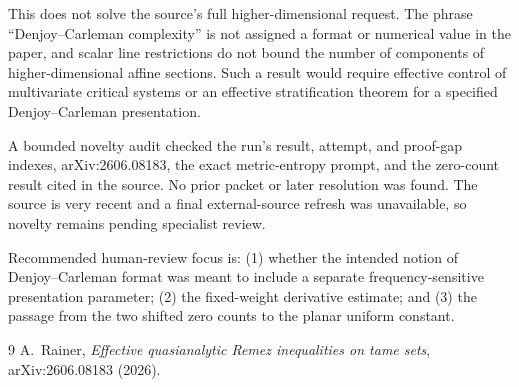 \documentclass[11pt]{article}
\begin{document}
This does not solve the source's full higher-dimensional request.  The phrase
``Denjoy--Carleman complexity'' is not assigned a format or numerical value in
the paper, and scalar line restrictions do not bound the number of components
of higher-dimensional affine sections.  Such a result would require effective
control of multivariate critical systems or an effective stratification
theorem for a specified Denjoy--Carleman presentation.

A bounded novelty audit checked the run's result, attempt, and proof-gap
indexes, arXiv:2606.08183, the exact metric-entropy prompt, and the zero-count
result cited in the source.  No prior packet or later resolution was found.
The source is very recent and a final external-source refresh was unavailable,
so novelty remains pending specialist review.

Recommended human-review focus is: (1) whether the intended notion of
Denjoy--Carleman format was meant to include a separate frequency-sensitive
presentation parameter; (2) the fixed-weight derivative estimate; and (3)
the passage from the two shifted zero counts to the planar uniform constant.

\begin{thebibliography}{9}
A.~Rainer,
\emph{Effective quasianalytic Remez inequalities on tame sets},
arXiv:2606.08183 (2026).
\end{thebibliography}
\end{document}
